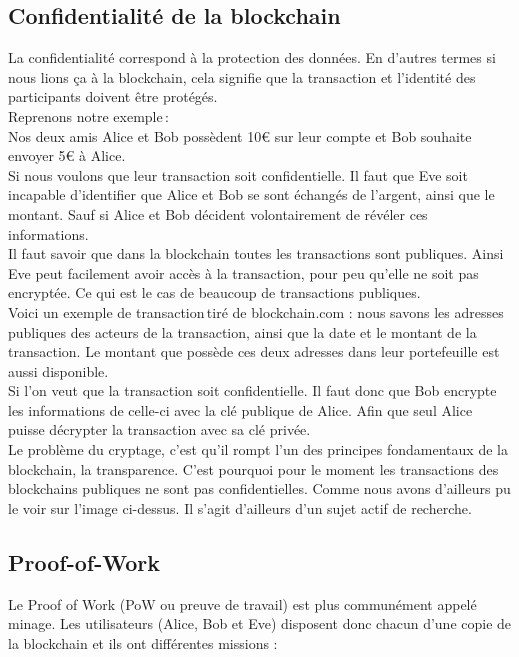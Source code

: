 \documentclass[12pt, a4paper, oneside]{book}
\begin{document}
    \newpage
    
    \subsection {Confidentialité de la blockchain}
    La confidentialité correspond à la protection des données. En d’autres termes si nous lions ça à la blockchain, cela signifie que la transaction et l’identité des participants doivent être protégés. 
    \\
    Reprenons notre exemple : 
    \\
    Nos deux amis Alice et Bob possèdent 10€ sur leur compte et Bob souhaite envoyer 5€ à Alice. 
    \\
    Si nous voulons que leur transaction soit confidentielle. Il faut que Eve soit incapable d’identifier que Alice et Bob se sont échangés de l’argent, ainsi que le montant. Sauf si Alice et Bob décident volontairement de révéler ces informations. 
    \\
    Il faut savoir que dans la blockchain toutes les transactions sont publiques. Ainsi Eve peut facilement avoir accès à la transaction, pour peu qu’elle ne soit pas encryptée. Ce qui est le cas de beaucoup de transactions publiques. 
    \\
    Voici un exemple de transaction tiré de blockchain.com : nous savons les adresses publiques des acteurs de la transaction, ainsi que la date et le montant de la transaction. Le montant que possède ces deux adresses dans leur portefeuille est aussi disponible. 
    \\
    Si l’on veut que la transaction soit confidentielle. Il faut donc que Bob encrypte les informations de celle-ci avec la clé publique de Alice. Afin que seul Alice puisse décrypter la transaction avec sa clé privée. 
    \\
    Le problème du cryptage, c’est qu’il rompt l’un des principes fondamentaux de la blockchain, la transparence. C’est pourquoi pour le moment les transactions des blockchains publiques ne sont pas confidentielles. Comme nous avons d’ailleurs pu le voir sur l’image ci-dessus. Il s’agit d’ailleurs d’un sujet actif de recherche. 

    \subsection{Proof-of-Work}

    Le Proof of Work (PoW ou preuve de travail) est plus communément appelé minage. Les utilisateurs (Alice, Bob et Eve) disposent donc chacun d’une copie de la blockchain et ils ont différentes missions :
\end{document}
